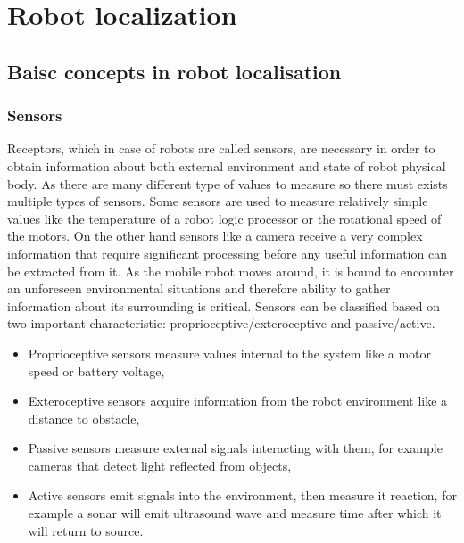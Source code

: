 \chapter{Robot localization}

\section{Baisc concepts in robot localisation}

\subsection{Sensors}
Receptors, which in case of robots are called sensors, are necessary in order to obtain information
about both external environment and state of robot physical body. As there are many different 
type of values to measure so there must exists multiple types of sensors. Some sensors are
used to measure relatively simple values like the temperature of a robot logic processor or the
rotational speed of the motors. On the other hand sensors like a camera receive a very complex
information that require significant processing before any useful information can be extracted
from it.
As the mobile robot moves around, it is bound to encounter an unforeseen environmental
situations and therefore ability to gather information about its surrounding is critical.
Sensors can be classified based on two important characteristic: proprioceptive/exteroceptive and
passive/active.
\begin{itemize}
	\item Proprioceptive sensors measure values internal to the system like a motor speed or
		battery voltage,
	\item Exteroceptive sensors acquire information from the robot environment like a distance
		to obstacle, 
	\item Passive sensors measure external signals interacting with them, for example cameras
		that detect light reflected from objects,
	\item Active sensors emit signals into the environment, then measure it reaction, for example
		a sonar will emit ultrasound wave and measure time after which it will return to source. 
\end{itemize}
